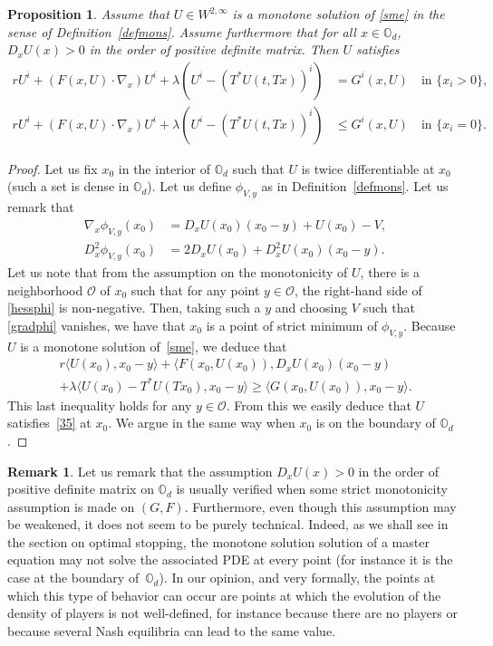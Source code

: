 \documentclass[JEP,XML,SOM,Unicode,NoEqCountersInSection,published]{cedram}
\let\mathcal\mathscr
\newtheorem{Prop}{Proposition}[section]
\theoremstyle{definition}
\newtheorem{Rem}{Remark}[section]
\begin{document}
\begin{Prop}\label{consist}
Assume that $U\in W^{2,\infty}$ is a monotone solution of \eqref{sme} in the sense of Definition~\ref{defmons}. Assume furthermore that for all $x \in \mathbb{O}_d$, $D_x U(x) > 0$ in the order of positive definite matrix. Then $U$ satisfies
\begin{equation}\label{35}
\begin{split}
r U^i+(F(x,U)\cdot \nabla_x)U^i+\lambda \left(U^i-(T^*U(t,Tx))^i\right)&= G^i(x,U) \quad\text{in } \{x_i > 0\},\\
r U^i+(F(x,U)\cdot \nabla_x)U^i+\lambda \left(U^i-(T^*U(t,Tx))^i\right)&\leq G^i(x,U) \quad\text{in } \{x_i =0\}.
\end{split}
\end{equation}
\end{Prop}
\begin{proof}
Let us fix $x_0$ in the interior of $\mathbb{O}_d$ such that $U$ is twice differentiable at $x_0$ (such a set is dense in $\mathbb{O}_d$). Let us define $\phi_{V,y}$ as in Definition~\ref{defmons}. Let us remark that
\begin{align}\label{gradphi}
\nabla_x \phi_{V,y}(x_0) &= D_x U(x_0) (x_0-y)+U(x_0)-V,\\\label{hessphi}
D^2_x \phi_{V,y}(x_0) &= 2 D_x U(x_0)+D^2_xU(x_0)(x_0-y).
\end{align}
Let us note that from the assumption on the monotonicity of $U$, there is a neighborhood $\mathcal{O}$ of $x_0$ such that for any point $y \in \mathcal{O}$, the right-hand side of \eqref{hessphi} is non-negative. Then, taking such a $y$ and choosing $V$ such that \eqref{gradphi} vanishes, we have that $x_0$ is a point of strict minimum of $\phi_{V,y}$. Because $U$ is a monotone solution of~\eqref{sme}, we deduce that
\begin{multline*}
r\langle U(x_0), x_0-y\rangle+\langle F(x_0,U(x_0)), D_x U(x_0)(x_0-y)\\
+ \lambda \langle U(x_0)-T^*U(Tx_0),x_0-y\rangle \geq \langle G(x_0, U(x_0)), x_0-y\rangle.
\end{multline*}
This last inequality holds for any $y \in \mathcal{O}$. From this we easily deduce that $U$ satisfies~\eqref{35} at $x_0$. We argue in the same way when $x_0$ is on the boundary of $\mathbb{O}_d$.
\end{proof}
\begin{Rem}
Let us remark that the assumption $D_x U(x) > 0$ in the order of positive definite matrix on $\mathbb{O}_d$ is usually verified when some strict monotonicity assumption is made on $(G,F)$. Furthermore, even though this assumption may be weakened, it does not seem to be purely technical. Indeed, as we shall see in the section on optimal stopping, the monotone solution solution of a master equation may not solve the associated PDE at every point (for instance it is the case at the boundary of~$\mathbb{O}_d$). In our opinion, and very formally, the points at which this type of behavior can occur are points at which the evolution of the density of players is not well-defined, for instance because there are no players or because several Nash equilibria can lead to the same value.
\end{Rem}
\end{document}
